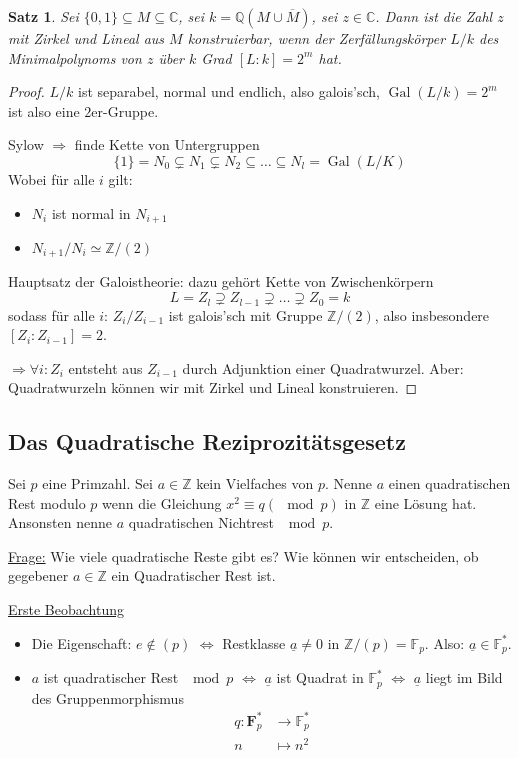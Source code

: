 \documentclass[a4paper,12pt,numbers=noenddot,parskip=full]{scrartcl}
\newcommand{\setZ}{\mathbb{Z}}
\newcommand{\setQ}{\mathbb{Q}}
\newcommand{\setC}{\mathbb{C}}
\newcommand{\heading}{\underline}
\DeclareMathOperator{\Gal}{Gal}
\theoremstyle{dotless}
\newtheorem{theorem}{Satz}[section]
\theoremstyle{remark}
\begin{document}
	\begin{theorem}
		Sei $\{ 0,1 \} \subseteq M \subseteq \setC$, sei $k = \setQ(M \cup \overline{M})$, sei $z \in \setC$. Dann ist die Zahl $z$ mit Zirkel und Lineal aus $M$ konstruierbar, wenn der Zerfällungskörper $L/k$ des Minimalpolynoms von $z$ über $k$ Grad $[L:k] = 2^m$ hat.
	\end{theorem}

	\begin{proof}
		$L/k$ ist separabel, normal und endlich, also galois'sch, $\Gal(L/k) = 2^m$ ist also eine $2$er-Gruppe.
		
		Sylow $\Rightarrow$ finde Kette von Untergruppen
		\begin{equation*}
			\{ 1 \} = N_0 \subsetneq N_1 \subsetneq N_2 \subseteq \dots \subseteq N_l = \Gal(L/K)
		\end{equation*}
		Wobei für alle $i$ gilt:
		\begin{itemize}
			\item $N_i$ ist normal in $N_{i+1}$
			\item $N_{i+1}/N_i \simeq \setZ/(2)$
		\end{itemize}
		Hauptsatz der Galoistheorie: dazu gehört Kette von Zwischenkörpern
		\begin{equation*}
			L = Z_l \supsetneq Z_{l-1} \supsetneq \dots \supsetneq Z_0 = k
		\end{equation*}
		sodass für alle $i$: $Z_i/Z_{i-1}$ ist galois'sch mit Gruppe $\setZ/(2)$, also insbesondere $[Z_i : Z_{i-1}] = 2$.
		
		$\Rightarrow \forall i: Z_i$ entsteht aus $Z_{i-1}$ durch Adjunktion einer Quadratwurzel. Aber: Quadratwurzeln können wir mit Zirkel und Lineal konstruieren.
	\end{proof}

	\subsection{Das Quadratische Reziprozitätsgesetz}
	
	Sei $p$ eine Primzahl. Sei $a \in \setZ$ kein Vielfaches von $p$. Nenne $a$ einen quadratischen Rest modulo $p$ wenn die Gleichung $x^2 \equiv q (\mod p)$ in $\setZ$ eine Lösung hat. Ansonsten nenne $a$ quadratischen Nichtrest $\mod p$.
	
	\heading{Frage:} Wie viele quadratische Reste gibt es? Wie können wir entscheiden, ob gegebener $a \in \setZ$ ein Quadratischer Rest ist.
	
	\heading{Erste Beobachtung}
	\begin{itemize}
		\item Die Eigenschaft: $e \notin (p)$ $\Leftrightarrow$ Restklasse $\underline{a} \neq 0$ in $\setZ / (p) = \mathbb{F}_p$. Also: $\underline{a} \in \mathbb{F}_p^*$.
		\item $a$ ist quadratischer Rest $\mod p$ $\Leftrightarrow$ $\underline{a}$ ist Quadrat in $\mathbb{F}_p^*$ $\Leftrightarrow$ $\underline{a}$ liegt im Bild des Gruppenmorphismus
		\begin{align*}
			q: \mathbf{F}_p^* &\longrightarrow \mathbb{F}_p^* \\
			n &\longmapsto n^2
		\end{align*}
	\end{itemize}
\end{document}
